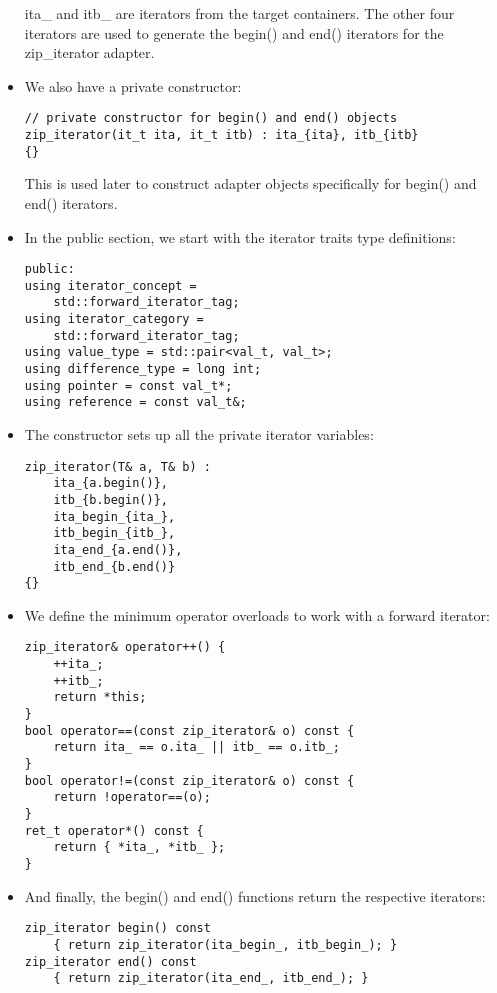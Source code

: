 \begin{itemize}
ita\_ and itb\_ are iterators from the target containers. The other four iterators are used to generate the begin() and end() iterators for the zip\_iterator adapter.

\item 
We also have a private constructor:

\begin{lstlisting}[style=styleCXX]
// private constructor for begin() and end() objects
zip_iterator(it_t ita, it_t itb) : ita_{ita}, itb_{itb}
{}
\end{lstlisting}

This is used later to construct adapter objects specifically for begin() and end() iterators.

\item 
In the public section, we start with the iterator traits type definitions:

\begin{lstlisting}[style=styleCXX]
public:
using iterator_concept =
	std::forward_iterator_tag;
using iterator_category =
	std::forward_iterator_tag;
using value_type = std::pair<val_t, val_t>;
using difference_type = long int;
using pointer = const val_t*;
using reference = const val_t&;
\end{lstlisting}

\item 
The constructor sets up all the private iterator variables:

\begin{lstlisting}[style=styleCXX]
zip_iterator(T& a, T& b) :
	ita_{a.begin()},
	itb_{b.begin()},
	ita_begin_{ita_},
	itb_begin_{itb_},
	ita_end_{a.end()},
	itb_end_{b.end()}
{}
\end{lstlisting}

\item 
We define the minimum operator overloads to work with a forward iterator:

\begin{lstlisting}[style=styleCXX]
zip_iterator& operator++() {
	++ita_;
	++itb_;
	return *this;
}
bool operator==(const zip_iterator& o) const {
	return ita_ == o.ita_ || itb_ == o.itb_;
}
bool operator!=(const zip_iterator& o) const {
	return !operator==(o);
}
ret_t operator*() const {
	return { *ita_, *itb_ };
}
\end{lstlisting}

\item 
And finally, the begin() and end() functions return the respective iterators:

\begin{lstlisting}[style=styleCXX]
zip_iterator begin() const
	{ return zip_iterator(ita_begin_, itb_begin_); }
zip_iterator end() const
	{ return zip_iterator(ita_end_, itb_end_); }
\end{lstlisting}


\end{itemize}
